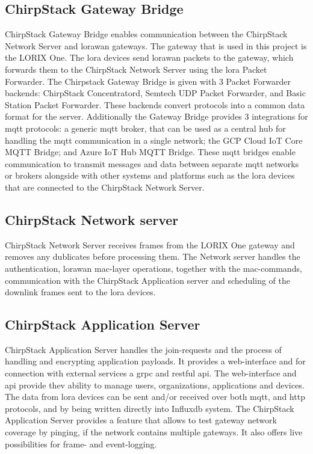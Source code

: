 \subsection{ChirpStack Gateway Bridge}
ChirpStack Gateway Bridge enables communication between the ChirpStack Network Server and \gls{lorawan} gateways.
The gateway that is used in this project is the LORIX One.
The \gls{lora} devices send \gls{lorawan} packets to the gateway, which forwards them to the ChirpStack Network Server using the \gls{lora} Packet Forwarder.
The Chirpstack Gateway Bridge is given with 3 Packet Forwarder backends: ChirpStack Concentratord, Semtech UDP Packet Forwarder, and Basic Station Packet Forwarder.
These backends convert protocols into a common data format for the server.
Additionally the Gateway Bridge provides 3 integrations for \gls{mqtt} protocols: a generic \gls{mqtt} broker, that can be used as a central hub for handling the \gls{mqtt} communication in a single network; the GCP Cloud IoT Core MQTT Bridge; and Azure IoT Hub MQTT Bridge.
These \gls{mqtt} bridges enable communication to transmit messages and data between separate \gls{mqtt} networks or brokers alongside with other systems and platforms such as the \gls{lora} devices that are connected to the ChirpStack Network Server.
\cite{chirpstack:gateway_bridge}

\subsection{ChirpStack Network server}
ChirpStack Network Server receives frames from the LORIX One gateway and removes any dublicates before processing them.
The Network server handles the authentication, \gls{lorawan} \gls{mac}-layer operations, together with the \gls{mac}-commands, communication with the ChirpStack Application server and scheduling of the downlink frames sent to the \gls{lora} devices.
\cite{chirpstack:network_server}

\subsection{ChirpStack Application Server}

ChirpStack Application Server handles the join-requests and the process of handling and encrypting application payloads.
It provides a web-interface and for connection with external services a \gls{grpc} and \gls{rest}ful \gls{api}.
The web-interface and \gls{api} provide thev ability to manage users, organizations, applications and devices.
The data from \gls{lora} devices can be sent and/or received over both \gls{mqtt}, and \gls{http} protocols, and by being  written directly into Influx\gls{db} system.
The ChirpStack Application Server provides a feature that allows to test gateway network coverage by pinging, if the network contains multiple gateways.
It also offers live possibilities for frame- and event-logging.
\cite{chirpstack:application_server}


